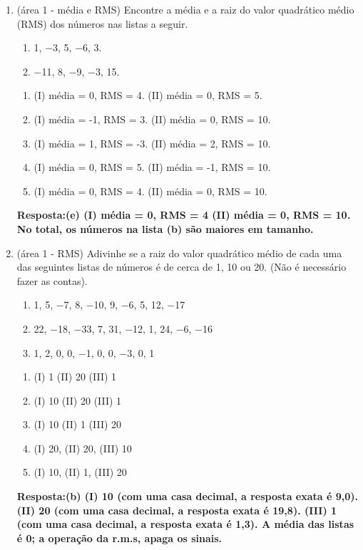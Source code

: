 \documentclass[12pt]{article}\documentclass[brazilian,12pt,a4paper,final]{article}
\begin{document}
\begin{enumerate}
\item (área 1 - média e RMS) Encontre a média e a raiz do valor quadrático médio (RMS) dos números nas listas a seguir.
\begin{enumerate}[label=(\Roman*)]
\item 1, −3, 5, −6, 3.
\item −11, 8, −9, −3, 15.
\end{enumerate}
\begin{enumerate}
    \item (I) média = 0, RMS = 4. (II) média = 0, RMS = 5.
    \item (I) média = -1, RMS = 3. (II) média = 0, RMS = 10.
    \item (I) média = 1, RMS = -3. (II) média = 2, RMS = 10.
    \item (I) média = 0, RMS = 5. (II) média = -1, RMS = 10.
    \item (I) média = 0, RMS = 4. (II) média = 0, RMS = 10.
    \end{enumerate}
\textbf{Resposta:(e)  (I) média = 0, RMS = 4
(II) média = 0, RMS = 10.
No total, os números na lista (b) são maiores em tamanho.
}

\item (área 1 - RMS) Adivinhe se a raiz do valor quadrático médio de cada uma das seguintes listas de números é de cerca de
1, 10 ou 20. (Não é necessário fazer as contas).
\begin{enumerate}[label=(\Roman*)]
\item 1, 5, −7, 8, −10, 9, −6, 5, 12, −17
\item 22, −18, −33, 7, 31, −12, 1, 24, −6, −16
\item 1, 2, 0, 0, −1, 0, 0, −3, 0, 1
\end{enumerate}
\begin{enumerate}
    \item (I) 1 (II) 20 (III) 1
    \item (I) 10 (II) 20 (III) 1
    \item (I) 10 (II) 1 (III) 20
    \item (I) 20, (II) 20, (III) 10
    \item (I) 10, (II) 1, (III) 20
\end{enumerate}

\textbf{Resposta:(b) (I) 10 (com uma casa decimal, a resposta exata é 9,0).
(II) 20 (com uma casa decimal, a resposta exata é 19,8).
(III) 1 (com uma casa decimal, a resposta exata é 1,3).
A média das listas é 0; a operação da r.m.s, apaga os sinais.}


\end{enumerate}
\end{document}
